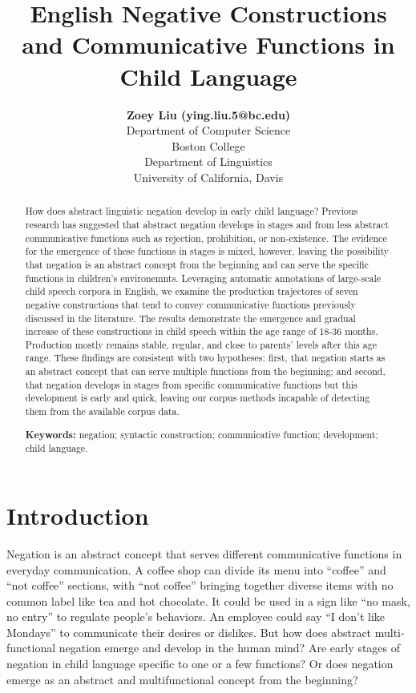 \documentclass[10pt, letterpaper]{article}
\title{English Negative Constructions and Communicative Functions in Child
Language}
\author{{\large \bf Zoey Liu (ying.liu.5@bc.edu)} \\ Department of Computer Science \\ Boston College \AND {\large \bf Masoud Jasbi (jasbi@ucdavis.edu)} \\ Department of Linguistics \\ University of California, Davis}
\begin{document}
\maketitle

\begin{abstract}
How does abstract linguistic negation develop in early child language?
Previous research has suggested that abstract negation develops in
stages and from less abstract communicative functions such as rejection,
prohibition, or non-existence. The evidence for the emergence of these
functions in stages is mixed, however, leaving the possibility that
negation is an abstract concept from the beginning and can serve the
specific functions in children's environemnts. Leveraging automatic
annotations of large-scale child speech corpora in English, we examine
the production trajectores of seven negative constructions that tend to
convey communicative functions previously discussed in the literature.
The results demonstrate the emergence and gradual increase of these
constructions in child speech within the age range of 18-36 months.
Production mostly remains stable, regular, and close to parents' levels
after this age range. These findings are consistent with two hypotheses:
first, that negation starts as an abstract concept that can serve
multiple functions from the beginning; and second, that negation
develops in stages from specific communicative functions but this
development is early and quick, leaving our corpus methods incapable of
detecting them from the available corpus data.

\textbf{Keywords:}
negation; syntactic construction; communicative function; development;
child language.
\end{abstract}

\hypertarget{introduction}{%
\section{Introduction}\label{introduction}}

Negation is an abstract concept that serves different communicative
functions in everyday communication. A coffee shop can divide its menu
into ``coffee'' and ``not coffee'' sections, with ``not coffee''
bringing together diverse items with no common label like tea and hot
chocolate. It could be used in a sign like ``no mask, no entry'' to
regulate people's behaviors. An employee could say ``I don't like
Mondays'' to communicate their desires or dislikes. But how does
abstract multi-functional negation emerge and develop in the human mind?
Are early stages of negation in child language specific to one or a few
functions? Or does negation emerge as an abstract and multifunctional
concept from the beginning?
\end{document}
